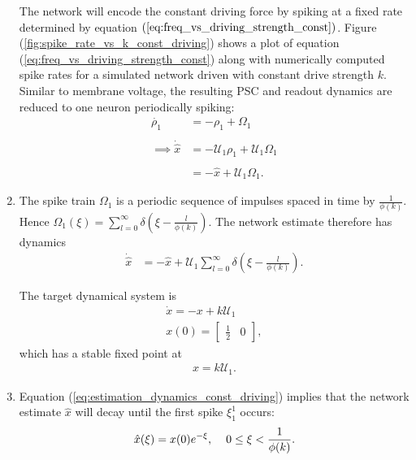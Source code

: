 \begin{enumerate}
The network will encode the constant driving force by spiking at a fixed rate determined by equation $(\ref{eq:freq_vs_driving_strength_const})$. Figure (\ref{fig:spike_rate_vs_k_const_driving}) shows a plot of equation (\ref{eq:freq_vs_driving_strength_const}) along with numerically computed spike rates for a simulated network driven with constant drive strength $k$.  Similar to membrane voltage, the resulting PSC and readout dynamics are reduced to one neuron periodically spiking:
\begin{align*}
\dot{\rho_1} &= -\rho_1 + \Omega_1 \\ 
\\
\implies 
\dot{\hat{x}} &= - \mathcal{U}_1 \rho_1 + \mathcal{U}_1 \Omega_1\\
\\ 
&= - \hat{x} + \mathcal{U}_1 \Omega_1. 
\end{align*}



\item The spike train $\Omega_1$ is a periodic sequence of impulses spaced in time by $\frac{1}{\phi(k)}$. Hence $\Omega_1(\xi) = \sum_{l=0}^{\infty} \delta \left(\xi - \frac{l}{\phi(k)}\right).$
The network estimate therefore has dynamics
\begin{align}
\label{eq:estimation_dynamics_const_driving}
\dot{\hat{x}} &= -\hat{x}  + \mathcal{U}_1 \sum_{l=0}^{\infty} \delta \left(\xi - \frac{l}{\phi(k)}\right).
\end{align}

The target dynamical system is
\begin{align*}
\dot{x} = - x + k 
 \mathcal{U}_1 \\
 x(0) = \begin{bmatrix} \frac{1}{2} & 0 \end{bmatrix},
\end{align*}
which has a stable fixed point at
\begin{align}
\label{eq:steady_state_dynamics_const_driving}
x = k \mathcal{U}_1.
\end{align}

\item Equation (\ref{eq:estimation_dynamics_const_driving}) implies that the network estimate $\hat{x}$ will decay until the first spike $\xi_1^1$ occurs:
\begin{align*}
\hat{x}(\xi) = x(0) e^{-\xi}, \hspace{4mm} 0 \leq \xi < \frac{1}{\phi(k)}.
\end{align*}



\end{enumerate}
